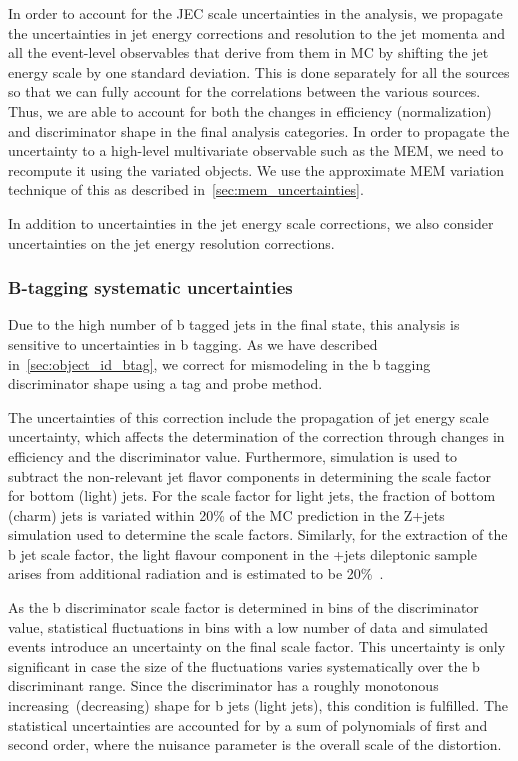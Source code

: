 In order to account for the JEC scale uncertainties in the analysis, we propagate the uncertainties in jet energy corrections and resolution to the jet momenta and all the event-level observables that derive from them in MC by shifting the jet energy scale by one standard deviation. This is done separately for all the sources so that we can fully account for the correlations between the various sources. Thus, we are able to account for both the changes in efficiency (normalization) and discriminator shape in the final analysis categories.
In order to propagate the uncertainty to a high-level multivariate observable such as the MEM, we need to recompute it using the variated objects. We use the approximate MEM variation technique of this as described in~\cref{sec:mem_uncertainties}.

In addition to uncertainties in the jet energy scale corrections, we also consider uncertainties on the jet energy resolution corrections. 
\subsubsection{B-tagging systematic uncertainties}
\label{sec:btag_unc}
Due to the high number of b tagged jets in the final state, this analysis is sensitive to uncertainties in b tagging. As we have described in~\cref{sec:object_id_btag}, we correct for mismodeling in the b tagging discriminator shape using a tag and probe method.

The uncertainties of this correction include the propagation of jet energy scale uncertainty, which affects the determination of the correction through changes in efficiency and the discriminator value. Furthermore, simulation is used to subtract the non-relevant jet flavor components in determining the scale factor for bottom (light) jets. For the scale factor for light jets, the fraction of bottom (charm) jets is variated within 20\% of the MC prediction in the Z+jets simulation used to determine the scale factors. Similarly, for the extraction of the b jet scale factor, the light flavour component in the \ttbar+jets dileptonic sample arises from additional radiation and is estimated to be 20\%~\cite{CMS-PAS-BTV-15-001}.

As the b discriminator scale factor is determined in bins of the discriminator value, statistical fluctuations in bins with a low number of data and simulated events introduce an uncertainty on the final scale factor. This uncertainty is only significant in case the size of the fluctuations varies systematically over the b discriminant range. Since the discriminator has a roughly monotonous increasing (decreasing) shape for b jets (light jets), this condition is fulfilled. The statistical uncertainties are accounted for by a sum of polynomials of first and second order, where the nuisance parameter is the overall scale of the distortion.

